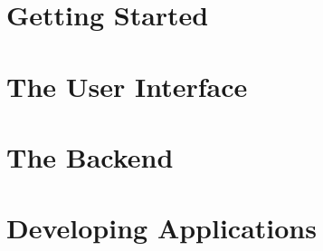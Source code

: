\documentclass[a4paper,10pt,twoside]{book}
\begin{document}
\frontmatter





\pagestyle{plain}

\tableofcontents
\sloppy


\mainmatter


\pagestyle{headings}

\part{Getting Started}




\part{The User Interface}


\part{The Backend}


\part{Developing Applications}





\end{document}
